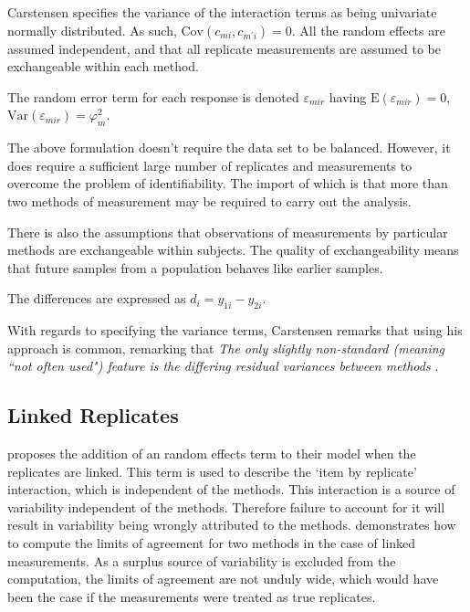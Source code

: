 \documentclass[12pt, a4paper]{report}
\theoremstyle{plain}
\theoremstyle{definition}
\theoremstyle{remark}
\begin{document}
	Carstensen specifies the variance of the interaction terms as being univariate normally distributed. As such, $\mathrm{Cov}(c_{mi}, c_{m^\prime i})= 0.$ All the random effects are assumed independent, and that all replicate measurements are assumed to be exchangeable within each method.
	
	The random error term for each response is denoted $\varepsilon_{mir}$ having $\mathrm{E}(\varepsilon_{mir})=0$, $\mathrm{Var}(\varepsilon_{mir})=\varphi^2_m$. 
	
	
	The above formulation doesn't require the data set to be balanced. However, it does require a sufficient large number of replicates and measurements to overcome the problem of identifiability. The import of which is that more than two methods of measurement may be required to carry out the analysis. 
	
	There is also the assumptions that observations of measurements by particular methods are exchangeable within subjects. The quality of exchangeability means that future samples from a population behaves like earlier samples.
	
	
	The differences are expressed as $d_{i} = y_{1i} - y_{2i}$.	
	
	With regards to specifying the variance terms, Carstensen remarks that using his approach is common, remarking that \emph{The only slightly non-standard (meaning ``not often used") feature is the differing residual variances between methods }\citep{BXC2010}.
	
	\subsection{Linked Replicates}
	
	
	\citet{BXC2008} proposes the addition of an random effects term to their model when the replicates are linked. This term is used to describe the `item by replicate' interaction, which is independent of the methods. This interaction is a source of variability independent of the methods. Therefore failure to account for it will result in variability being wrongly attributed to the methods. \citet{BXC2008} demonstrates how to compute the limits of agreement for two methods in the case of linked measurements. As a surplus source of variability is excluded from the computation, the limits of agreement are not unduly wide, which would have been the case if the measurements were treated as true replicates.
	
\end{document}
